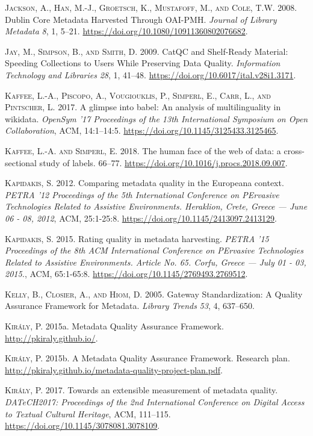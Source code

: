 \textsc{Jackson, A., Han, M.-J., Groetsch, K., Mustafoff, M., and Cole, T.W.} 2008. Dublin Core Metadata Harvested Through OAI-PMH. \emph{Journal of Library Metadata} \emph{8}, 1, 5–21. \url{https://doi.org/10.1080/10911360802076682}.

\textsc{Jay, M., Simpson, B., and Smith, D.} 2009. CatQC and Shelf-Ready Material: Speeding Collections to Users While Preserving Data Quality. \emph{Information Technology and Libraries} \emph{28}, 1, 41–48. \url{https://doi.org/10.6017/ital.v28i1.3171}.

\textsc{Kaffee, L.-A., Piscopo, A., Vougiouklis, P., Simperl, E., Carr, L., and Pintscher, L.} 2017. A glimpse into babel: An analysis of multilinguality in wikidata. \emph{OpenSym ’17 Proceedings of the 13th International Symposium on Open Collaboration}, ACM, 14:1--14:5. \url{https://doi.org/10.1145/3125433.3125465}.

\textsc{Kaffee, L.-A. and Simperl, E.} 2018. The human face of the web of data: a cross-sectional study of labels. 66–77. \url{https://doi.org/10.1016/j.procs.2018.09.007}.

\textsc{Kapidakis, S.} 2012. Comparing metadata quality in the Europeana context. \emph{PETRA ’12 Proceedings of the 5th International Conference on PErvasive Technologies Related to Assistive Environments. Heraklion, Crete, Greece — June 06 - 08, 2012}, ACM, 25:1-25:8. \url{https://doi.org/10.1145/2413097.2413129}.

\textsc{Kapidakis, S.} 2015. Rating quality in metadata harvesting. \emph{PETRA ’15 Proceedings of the 8th ACM International Conference on PErvasive Technologies Related to Assistive Environments. Article No. 65. Corfu, Greece — July 01 - 03, 2015.}, ACM, 65:1-65:8. \url{https://doi.org/10.1145/2769493.2769512}.

\textsc{Kelly, B., Closier, A., and Hiom, D.} 2005. Gateway Standardization: A Quality Assurance Framework for Metadata. \emph{Library Trends} \emph{53}, 4, 637–650.

\textsc{Király, P.} 2015a. Metadata Quality Assurance Framework. \url{http://pkiraly.github.io/}.

\textsc{Király, P.} 2015b. A Metadata Quality Assurance Framework. Research plan. \url{http://pkiraly.github.io/metadata-quality-project-plan.pdf}.

\textsc{Király, P.} 2017. Towards an extensible measurement of metadata quality. \emph{DATeCH2017: Proceedings of the 2nd International Conference on Digital Access to Textual Cultural Heritage}, ACM, 111–115. \url{https://doi.org/10.1145/3078081.3078109}.

